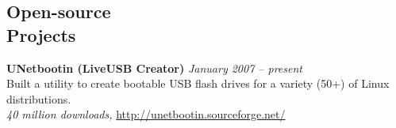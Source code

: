 \documentclass[margin,line]{resume}
\begin{document}
\begin{resume}




\section{\mysidestyle Open-source\\Projects}

\textbf{UNetbootin (LiveUSB Creator)} \hfill \textsl{January 2007 -- present}\\
Built a utility to create bootable USB flash drives for a variety (50+) of Linux distributions.\\ %
\emph{40 million downloads,} \url{http://unetbootin.sourceforge.net/}


\end{resume}
\end{document}
